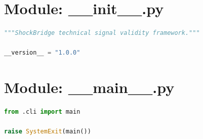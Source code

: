 \documentclass[11pt,a4paper]{report}
\begin{document}
\begin{lstlisting}[language=Python]
\end{lstlisting}
\section{Module: \_\_init\_\_.py}
\begin{lstlisting}[language=Python]
"""ShockBridge technical signal validity framework."""

__version__ = "1.0.0"

\end{lstlisting}
\section{Module: \_\_main\_\_.py}
\begin{lstlisting}[language=Python]
from .cli import main

raise SystemExit(main())

\end{lstlisting}
\end{document}

